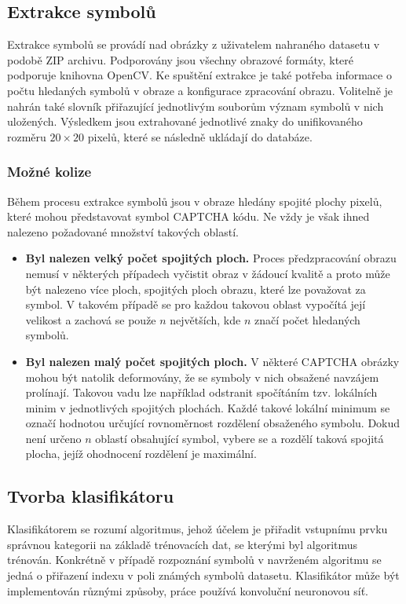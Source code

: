 \documentclass[
  field=ainfp,
  master=true,
  biblatex,
  sourcecodes=false,
  theorems=false,
  glossaries,
  index
]{kidiplom}
\begin{document}
\subsection{Extrakce symbolů}
Extrakce symbolů se provádí nad obrázky z uživatelem nahraného datasetu v podobě ZIP archivu. Podporovány jsou všechny obrazové formáty, které podporuje knihovna OpenCV. Ke spuštění extrakce je také potřeba informace o počtu hledaných symbolů v obraze a konfigurace zpracování obrazu. Volitelně je nahrán také slovník přiřazující jednotlivým souborům význam symbolů v nich uložených. Výsledkem jsou extrahované jednotlivé znaky do unifikovaného rozměru  $20\times20$ pixelů, které se následně ukládají do databáze.

\subsubsection*{Možné kolize}
Během procesu extrakce symbolů jsou v obraze hledány spojité plochy pixelů, které mohou představovat symbol CAPTCHA kódu. Ne vždy je však ihned nalezeno požadované množství takových oblastí. 
\begin{itemize}
\item \textbf{Byl nalezen velký počet spojitých ploch.} Proces předzpracování obrazu nemusí v některých případech vyčistit obraz v žádoucí kvalitě a proto může být nalezeno více ploch, spojitých ploch obrazu, které lze považovat za symbol. V takovém případě se pro každou takovou oblast vypočítá její velikost a zachová se použe $n$ největších, kde $n$ značí počet hledaných symbolů.

\item \textbf{Byl nalezen malý počet spojitých ploch.} V některé CAPTCHA obrázky mohou být natolik deformovány, že se symboly v nich obsažené navzájem prolínají. Takovou vadu lze například odstranit spočítáním tzv. lokálních minim v jednotlivých spojitých plochách. Každé takové lokální minimum se označí hodnotou určující rovnoměrnost rozdělení obsaženého symbolu. Dokud není určeno $n$ oblastí obsahující symbol, vybere se a rozdělí taková spojitá plocha, jejíž ohodnocení rozdělení je maximální.
\end{itemize}


\subsection{Tvorba klasifikátoru}
Klasifikátorem se rozumí algoritmus, jehož účelem je přiřadit vstupnímu prvku správnou kategorii na základě trénovacích dat, se kterými byl algoritmus trénován. Konkrétně v případě rozpoznání symbolů v navrženém algoritmu se jedná o přiřazení indexu v poli známých symbolů datasetu. Klasifikátor může být implementován různými způsoby, práce používá konvoluční neuronovou síť.
\end{document}
